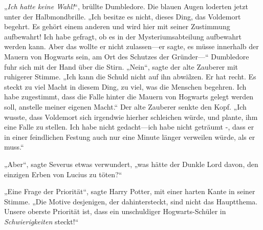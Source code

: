 „\emph{Ich hatte keine Wahl!}“, brüllte Dumbledore.
Die blauen Augen loderten jetzt unter der Halbmondbrille.
„Ich besitze es nicht, dieses Ding, das Voldemort begehrt. Es gehört einem anderen und wird hier mit seiner Zustimmung aufbewahrt! Ich habe gefragt, ob es in der Mysteriumsabteilung aufbewahrt werden kann. Aber das wollte er nicht zulassen—er sagte, es müsse innerhalb der Mauern von Hogwarts sein, am Ort des Schutzes der Gründer—“
Dumbledore fuhr sich mit der Hand über die Stirn.
„Nein“, sagte der alte Zauberer mit ruhigerer Stimme. „Ich kann die Schuld nicht auf ihn abwälzen. Er hat recht. Es steckt zu viel Macht in diesem Ding, zu viel, was die Menschen begehren. Ich habe zugestimmt, dass die Falle hinter die Mauern von Hogwarts gelegt werden soll, anstelle meiner eigenen Macht.“
Der alte Zauberer senkte den Kopf.
„Ich wusste, dass Voldemort sich irgendwie hierher schleichen würde, und plante, ihm eine Falle zu stellen. Ich habe nicht gedacht—ich habe nicht geträumt -, dass er in einer feindlichen Festung auch nur eine Minute länger verweilen würde, als er muss.“

„Aber“, sagte Severus etwas verwundert, „was hätte der Dunkle Lord davon, den einzigen Erben von Lucius zu töten?“

„Eine Frage der Priorität“, sagte Harry Potter, mit einer harten Kante in seiner Stimme. „Die Motive desjenigen, der dahintersteckt, sind nicht das Hauptthema. Unsere oberste Priorität ist, dass ein unschuldiger Hogwarts-Schüler in \emph{Schwierigkeiten} steckt!“

